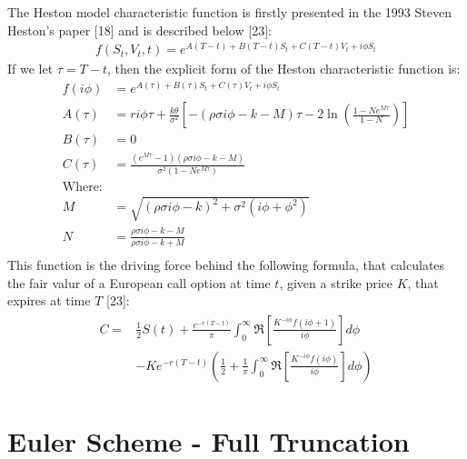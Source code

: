 \documentclass[12pt,twoside]{reedthesis}
\theoremstyle{definition}
\theoremstyle{definition}
\theoremstyle{remark}
\begin{document}
  The Heston model characteristic function is firstly presented in the
  1993 Steven Heston's paper {[}18{]} and is described below {[}23{]}:
  \begin{align}
  f(S_t, V_t, t) = e^{A(T-t)+B(T-t)S_t + C(T-t)V_t + i \phi S_t}
  \end{align}
  If we let \(\tau = T-t\), then the explicit form of the Heston
  characteristic function is:
  \begin{align*}
  f(i \phi) &= e^{A(\tau)+B(\tau)S_t + C(\tau)V_t + i \phi S_t} \\
  A(\tau) &= r i \phi \tau + \frac{k \theta}{\sigma^2} \left[ - (\rho \sigma i \phi - k - M) \tau - 2 \ln\left(\frac{1-N e^{M \tau}}{1-N}\right) \right] \\
  B(\tau) &= 0 \\
  C(\tau) &= \frac{(e^{M \tau}-1)(\rho \sigma i \phi - k - M)}{\sigma^2 (1-N e^{M \tau})} \\
  \text{Where:} & \\
  M &= \sqrt{(\rho \sigma i \phi - k)^2 + \sigma^2 (i \phi + \phi^2)} \\
  N &= \frac{\rho \sigma i \phi - k - M}{\rho \sigma i \phi - k + M} \\
  \end{align*}
  This function is the driving force behind the following formula, that
  calculates the fair valur of a European call option at time \(t\), given
  a strike price \(K\), that expires at time \(T\) {[}23{]}:
  \begin{align} 
  \label{eq:cfheston}
  \begin{split}
  C = & \frac{1}{2} S(t) + \frac{e^{-r(T-t)}}{\pi}\int_{0}^{\infty}{\Re \left[ \frac{K^{-i \phi} f(i \phi + 1)}{i \phi} \right] d\phi} \\
  & -Ke^{-r(T-t)}\left( \frac{1}{2} + \frac{1}{\pi} \int_{0}^{\infty}{\Re \left[ \frac{K^{-i \phi} f(i \phi)}{i \phi} \right]}  d\phi \right)
  \end{split}
  \end{align}
  \section{Euler Scheme - Full
  Truncation}\label{euler-scheme---full-truncation}
  
\end{document}
